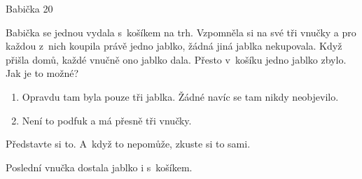 Babička
20 %

Babička se jednou vydala s~košíkem na trh. Vzpomněla si na své tři vnučky a pro každou z~nich koupila právě jedno jablko, žádná jiná jablka nekupovala. Když přišla  domů, každé vnučně ono jablko dala. Přesto v~košíku jedno jablko zbylo. Jak je to možné? 

\begin{enumerate}
\item Opravdu tam byla pouze tři jablka. Žádné navíc se tam nikdy neobjevilo.
\item Není to podfuk a má přesně tři vnučky.
\end{enumerate}

Představte si to. A~když to nepomůže, zkuste si to sami.

Poslední vnučka dostala jablko i s~košíkem.

